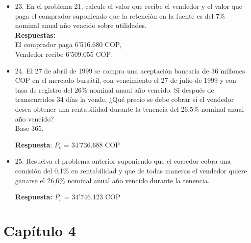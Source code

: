 \begin{itemize}
       \textbf{Respuestas:} a) $i_{R}$ = 32,4\% nominal anual año vencido ; b) $P_{R}$ = 9'344.234 COP; c) 32,775\% nominal anual año vencido \\
       d) 9'337.850 COP; e)$P_{c}$ = 9'351.070 COP;  nominal anual año vencido ; f) 45.904 COP; g)9'396.974 COP;
       h) 9'383.754 COP nominal anual año vencido ; i) 29,352\% nominal anual año vencido.\\
       \medskip

 \item 23. En el problema 21, calcule el valor que recibe el vendedor y el valor que paga el comprador suponiendo que la retención en la fuente es del 7\% nominal anual año vencido sobre utilidades.\\
       \textbf{Respuestas:}\\
       El comprador paga 6'516.680 COP,\\
       Vendedor recibe 6'509.055 COP.\\
       \medskip

 \item 24. El 27 de abril de 1999 se compra una aceptación bancaria de 36 millones COP en el mercado bursátil, con vencimiento el 27 de julio de 1999 y con tasa de registro del 26\% nominal anual año vencido. Si después de transcurridos 34 días la vende. ¿Qué precio se debe cobrar si el vendedor desea obtener una rentabilidad durante la tenencia del 26,5\% nominal anual año vencido?\\
       Base 365.
       
       \textbf{Respuesta}: $P_{v}$ = 34'736.688 COP\\
       \medskip

 \item 25. Resuelva el problema anterior suponiendo que el corredor cobra una comisión del 0,1\% en rentabilidad y que de todas maneras el vendedor quiere ganarse el 26,6\% nominal anual año vencido durante la tenencia.
 
       \textbf{Respuesta:} $P_{v}$ = 34'746.123 COP\\

\end{itemize}


\chapter*{Capítulo 4}

